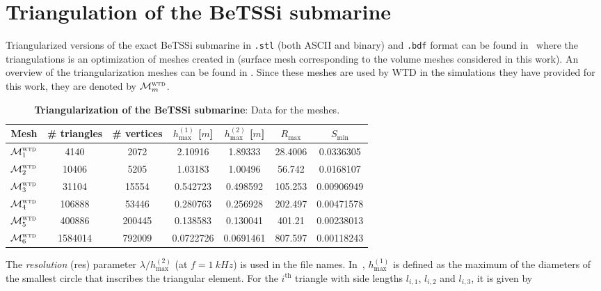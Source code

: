 \section{Triangulation of the BeTSSi submarine}
\label{Sec3:BeTSSi_triangulation}
Triangularized versions of the exact BeTSSi submarine in \texttt{.stl} (both ASCII and binary) and \texttt{.bdf} format can be found in~\cite{Venas2019bts} where the triangulations is an optimization of meshes created in \COMSOL (surface mesh corresponding to the \COMSOL volume meshes considered in this work). 
An overview of the triangularization meshes can be found in . Since these meshes are used by WTD in the simulations they have provided for this work, they are denoted by ${\cal M}_m^{\textsc{wtd}}$.
\begin{table}
	\centering
	\caption{\textbf{Triangularization of the BeTSSi submarine}: Data for the meshes.}
	\label{Tab3:BeTSSiTriangularization}
	\begin{tabular}{c S[table-format = 8.0] S[table-format = 8.0] S[table-format = 1.3,round-mode=places,round-precision=3] S[table-format = 1.3,round-mode=places,round-precision=3] S[table-format = 3.1,round-mode=places,round-precision=1] S[table-format = 1.4,round-mode=places,round-precision=4]}
		\toprule
		Mesh & {\# triangles} & {\# vertices}  & {$h_{\mathrm{max}}^{(1)}$ [$\si{m}$]}  & {$h_{\mathrm{max}}^{(2)}$ [$\si{m}$]}  & {$R_{\mathrm{max}}$} & {$S_{\mathrm{min}}$}\\
		\hline
		${\cal M}_{1}^{\textsc{wtd}}$ & 4140 & 2072 & 2.10916 & 1.89333 & 28.4006 & 0.0336305\\
		${\cal M}_{2}^{\textsc{wtd}}$ & 10406 & 5205 & 1.03183 & 1.00496 & 56.742 & 0.0168107\\
		${\cal M}_{3}^{\textsc{wtd}}$ & 31104 & 15554 & 0.542723 & 0.498592 & 105.253 & 0.00906949\\
		${\cal M}_{4}^{\textsc{wtd}}$ & 106888 & 53446 & 0.280763 & 0.256928 & 202.497 & 0.00471578\\
		${\cal M}_{5}^{\textsc{wtd}}$ & 400886 & 200445 & 0.138583 & 0.130041 & 401.21 & 0.00238013\\
		${\cal M}_{6}^{\textsc{wtd}}$ & 1584014 & 792009 & 0.0722726 & 0.0691461 & 807.597 & 0.00118243\\
		\bottomrule
	\end{tabular}
\end{table}
The \textit{resolution} (res) parameter $\lambda/h_{\mathrm{max}}^{(2)}$ (at $f = \SI{1}{kHz}$) is used in the file names. In~, $h_{\mathrm{max}}^{(1)}$ is defined as the maximum of the diameters of the smallest circle that inscribes the triangular element. For the $i^{\mathrm{th}}$ triangle with side lengths $l_{i,1}$, $l_{i,2}$ and $l_{i,3}$, it is given by
